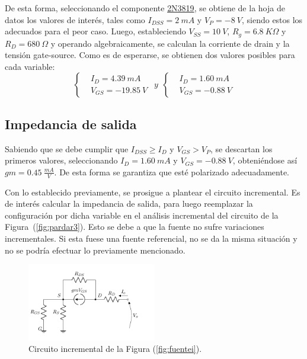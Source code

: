 De esta forma, seleccionando el componente \href{https://www.onsemi.com/pub/Collateral/2N3819-D.PDF}{2N3819}, se obtiene de la hoja de datos los valores de interés, tales como $I_{DSS} = 2 \ mA$ y $V_P = -8 \ V$, siendo estos los adecuados para el peor caso. Luego, estableciendo $V_{SS} = 10 \ V$, $R_g = 6.8 \ K\Omega$ y $R_D = 680 \ \Omega$ y operando algebraicamente, se calculan la corriente de drain y la tensión gate-source. Como es de esperarse, se obtienen dos valores posibles para cada variable:
\begin{equation*}
\left\lbrace
\begin{split}
	&I_{D} =  4.39 \ mA \\
	&V_{GS} =  -19.85 \ V
\end{split}
\right.
\ \ y \ \
\left\lbrace
\begin{split}
	&I_{D} =  1.60 \ mA \\
	&V_{GS} =  -0.88 \ V
\end{split}
\right.
\end{equation*}

\subsection{Impedancia de salida}
Sabiendo que se debe cumplir que $I_{DSS} \geq I_{D}$ y $V_{GS} > V_{P}$, se descartan los primeros valores, seleccionando $I_{D} = 1.60 \ mA$ y $V_{GS} = -0.88 \ V$, obteniéndose así $gm = 0.45 \ \frac{mA}{V}$. De esta forma se garantiza que esté polarizado adecuadamente.

Con lo establecido previamente, se prosigue a plantear el circuito incremental. Es de interés calcular la impedancia de salida, para luego reemplazar la configuración por dicha variable en el análisis incremental del circuito de la Figura~(\ref{fig:pardar3}). Esto se debe a que la fuente no sufre variaciones incrementales. Si esta fuese una fuente referencial, no se da la misma situación y no se podría efectuar lo previamente mencionado.
\begin{figure}[H]
\centering
	\includegraphics[width=0.5\textwidth, page=1]{Imagenes/ModeloIncremental.pdf}
	\caption{Circuito incremental de la Figura (\ref{fig:fuentei}).}
\label{fig:incfuente1}
\end{figure}

